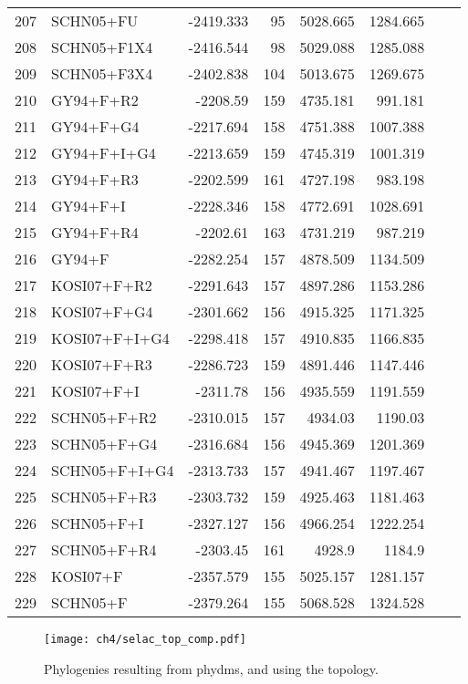 \begin{longtable}{clrrrrrr}
	207 & SCHN05+FU & -2419.333 & 95 & 5028.665 & 1284.665 \\ 
	208 & SCHN05+F1X4 & -2416.544 & 98 & 5029.088 & 1285.088 \\ 
	209 & SCHN05+F3X4 & -2402.838 & 104 & 5013.675 & 1269.675 \\ 
	210 & GY94+F+R2 & -2208.59 & 159 & 4735.181 & 991.181 \\ 
	211 & GY94+F+G4 & -2217.694 & 158 & 4751.388 & 1007.388 \\ 
	212 & GY94+F+I+G4 & -2213.659 & 159 & 4745.319 & 1001.319 \\ 
	213 & GY94+F+R3 & -2202.599 & 161 & 4727.198 & 983.198 \\ 
	214 & GY94+F+I & -2228.346 & 158 & 4772.691 & 1028.691 \\ 
	215 & GY94+F+R4 & -2202.61 & 163 & 4731.219 & 987.219 \\ 
	216 & GY94+F & -2282.254 & 157 & 4878.509 & 1134.509 \\ 
	217 & KOSI07+F+R2 & -2291.643 & 157 & 4897.286 & 1153.286 \\ 
	218 & KOSI07+F+G4 & -2301.662 & 156 & 4915.325 & 1171.325 \\ 
	219 & KOSI07+F+I+G4 & -2298.418 & 157 & 4910.835 & 1166.835 \\ 
	220 & KOSI07+F+R3 & -2286.723 & 159 & 4891.446 & 1147.446 \\ 
	221 & KOSI07+F+I & -2311.78 & 156 & 4935.559 & 1191.559 \\ 
	222 & SCHN05+F+R2 & -2310.015 & 157 & 4934.03 & 1190.03 \\ 
	223 & SCHN05+F+G4 & -2316.684 & 156 & 4945.369 & 1201.369 \\ 
	224 & SCHN05+F+I+G4 & -2313.733 & 157 & 4941.467 & 1197.467 \\ 
	225 & SCHN05+F+R3 & -2303.732 & 159 & 4925.463 & 1181.463 \\ 
	226 & SCHN05+F+I & -2327.127 & 156 & 4966.254 & 1222.254 \\ 
	227 & SCHN05+F+R4 & -2303.45 & 161 & 4928.9 & 1184.9 \\ 
	228 & KOSI07+F & -2357.579 & 155 & 5025.157 & 1281.157 \\ 
	229 & SCHN05+F & -2379.264 & 155 & 5068.528 & 1324.528  \\
\end{longtable}

\clearpage

\singlespacing
\begin{figure}[H]
     \centering
	\texttt{[image: ch4/selac\_top\_comp.pdf]}
	\caption{Phylogenies resulting from phydms, and \selac using the \phydms topology.}
	\label{fig:phylo_comp}
\end{figure}
\doublespacing
